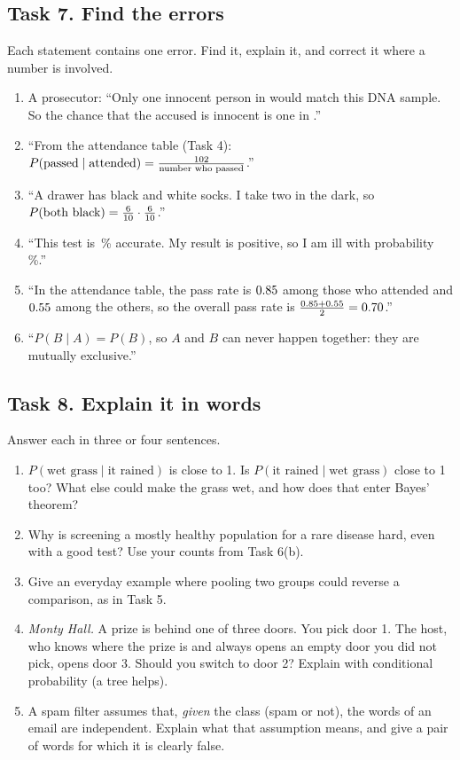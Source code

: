\subsection*{Task 7. Find the errors}
Each statement contains one error. Find it, explain it, and correct it where a number is involved.
\begin{enumerate}[label=(\alph*)]
  \item A prosecutor: ``Only one innocent person in \hwMatch{} would match this DNA sample. So the chance that the
        accused is innocent is one in \hwMatch.''
  \item ``From the attendance table (Task 4): $P(\text{passed} \mid \text{attended}) = \frac{102}{\text{number
        who passed}}$.''
  \item ``A drawer has \hwSockB{} black and \hwSockW{} white socks. I take two in the dark, so
        $P(\text{both black}) = \frac{6}{10} \cdot \frac{6}{10}$.''
  \item ``This test is \hwAccuracy\,\% accurate. My result is positive, so I am ill with probability
        \hwAccuracy\,\%.''
  \item ``In the attendance table, the pass rate is $0.85$ among those who attended and $0.55$ among the others, so the
        overall pass rate is $\frac{0.85 + 0.55}{2} = 0.70$.''
  \item ``$P(B \mid A) = P(B)$, so $A$ and $B$ can never happen together: they are mutually exclusive.''
\end{enumerate}

\subsection*{Task 8. Explain it in words}
Answer each in three or four sentences.
\begin{enumerate}[label=(\alph*)]
  \item $P(\text{wet grass} \mid \text{it rained})$ is close to 1. Is $P(\text{it rained} \mid \text{wet grass})$ close
        to 1 too? What else could make the grass wet, and how does that enter Bayes' theorem?
  \item Why is screening a mostly healthy population for a rare disease hard, even with a good test? Use your counts
        from Task 6(b).
  \item Give an everyday example where pooling two groups could reverse a comparison, as in Task 5.
  \item \emph{Monty Hall.} A prize is behind one of three doors. You pick door 1. The host, who knows where the prize
        is and always opens an empty door you did not pick, opens door 3. Should you switch to door 2? Explain with
        conditional probability (a tree helps).
  \item A spam filter assumes that, \emph{given} the class (spam or not), the words of an email are independent.
        Explain what that assumption means, and give a pair of words for which it is clearly false.
\end{enumerate}

